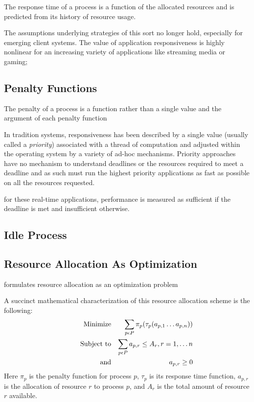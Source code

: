 The response time of a process is a function of the allocated resources and is predicted from its history of resource usage.

The assumptions underlying strategies of this sort no longer hold, especially for emerging client systems.  The value of application responsiveness is highly nonlinear for an increasing variety of applications like streaming media or gaming;    

\subsection*{Penalty Functions}


The penalty of a process is a function rather than a single value
    and the argument of each penalty function
    
    
In tradition systems, responsiveness has been described by a single value (usually called a \emph{priority}) associated with a thread of computation and adjusted within the operating system by a variety of ad-hoc mechanisms.   Priority approaches have no mechanism to understand deadlines or the resources required to meet a deadline and as such must run the highest priority applications as fast as possible on all the resources requested. 

for these real-time applications, performance is measured as sufficient if the deadline is met and insufficient otherwise.
    
    
\subsection*{Idle Process}    

\subsection*{Resource Allocation As Optimization}
\pacora formulates resource allocation as an optimization problem 


A succinct mathematical characterization of this resource allocation scheme is the following:
\begin{eqnarray*}
& \makebox[1in][r]{Minimize}   & \sum_{p\epsilon P} {\pi_p(\tau_p(a_{p,1}\ldots a_{p,n}))}  \\
& \makebox[1in][r]{Subject to} & \sum_{p\epsilon P} a_{p,r} \leq A_r, r = 1,\ldots n        \\
& \makebox[1in][r]{and}        & a_{p,r} \geq 0
\end{eqnarray*}
Here $\pi_p$ is the penalty function for process $p$,
$\tau_p$ is its response time function,
$a_{p,r}$ is the allocation of resource $r$ to process $p$,
and $A_r$ is the total amount of resource $r$ available.


